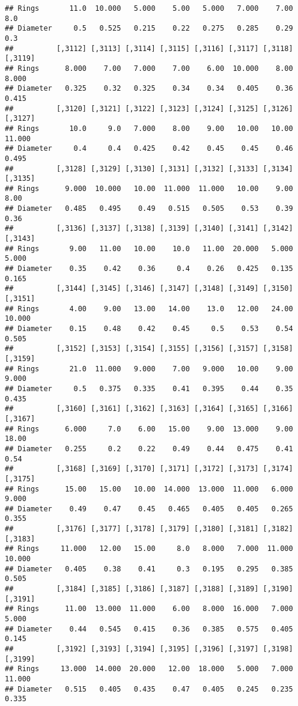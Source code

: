 \documentclass[
]{article}
\begin{document}
\begin{verbatim}
## Rings       11.0  10.000   5.000    5.00   5.000   7.000    7.00     8.0
## Diameter     0.5   0.525   0.215    0.22   0.275   0.285    0.29     0.3
##          [,3112] [,3113] [,3114] [,3115] [,3116] [,3117] [,3118] [,3119]
## Rings      8.000    7.00   7.000    7.00    6.00  10.000    8.00   8.000
## Diameter   0.325    0.32   0.325    0.34    0.34   0.405    0.36   0.415
##          [,3120] [,3121] [,3122] [,3123] [,3124] [,3125] [,3126] [,3127]
## Rings       10.0     9.0   7.000    8.00    9.00   10.00   10.00  11.000
## Diameter     0.4     0.4   0.425    0.42    0.45    0.45    0.46   0.495
##          [,3128] [,3129] [,3130] [,3131] [,3132] [,3133] [,3134] [,3135]
## Rings      9.000  10.000   10.00  11.000  11.000   10.00    9.00    8.00
## Diameter   0.485   0.495    0.49   0.515   0.505    0.53    0.39    0.36
##          [,3136] [,3137] [,3138] [,3139] [,3140] [,3141] [,3142] [,3143]
## Rings       9.00   11.00   10.00    10.0   11.00  20.000   5.000   5.000
## Diameter    0.35    0.42    0.36     0.4    0.26   0.425   0.135   0.165
##          [,3144] [,3145] [,3146] [,3147] [,3148] [,3149] [,3150] [,3151]
## Rings       4.00    9.00   13.00   14.00    13.0   12.00   24.00  10.000
## Diameter    0.15    0.48    0.42    0.45     0.5    0.53    0.54   0.505
##          [,3152] [,3153] [,3154] [,3155] [,3156] [,3157] [,3158] [,3159]
## Rings       21.0  11.000   9.000    7.00   9.000   10.00    9.00   9.000
## Diameter     0.5   0.375   0.335    0.41   0.395    0.44    0.35   0.435
##          [,3160] [,3161] [,3162] [,3163] [,3164] [,3165] [,3166] [,3167]
## Rings      6.000     7.0    6.00   15.00    9.00  13.000    9.00   18.00
## Diameter   0.255     0.2    0.22    0.49    0.44   0.475    0.41    0.54
##          [,3168] [,3169] [,3170] [,3171] [,3172] [,3173] [,3174] [,3175]
## Rings      15.00   15.00   10.00  14.000  13.000  11.000   6.000   9.000
## Diameter    0.49    0.47    0.45   0.465   0.405   0.405   0.265   0.355
##          [,3176] [,3177] [,3178] [,3179] [,3180] [,3181] [,3182] [,3183]
## Rings     11.000   12.00   15.00     8.0   8.000   7.000  11.000  10.000
## Diameter   0.405    0.38    0.41     0.3   0.195   0.295   0.385   0.505
##          [,3184] [,3185] [,3186] [,3187] [,3188] [,3189] [,3190] [,3191]
## Rings      11.00  13.000  11.000    6.00   8.000  16.000   7.000   5.000
## Diameter    0.44   0.545   0.415    0.36   0.385   0.575   0.405   0.145
##          [,3192] [,3193] [,3194] [,3195] [,3196] [,3197] [,3198] [,3199]
## Rings     13.000  14.000  20.000   12.00  18.000   5.000   7.000  11.000
## Diameter   0.515   0.405   0.435    0.47   0.405   0.245   0.235   0.335

\end{verbatim}
\end{document}
